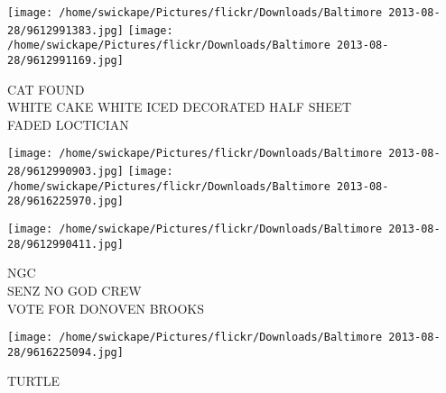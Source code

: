 \documentclass[10pt,letterpaper]{article}
\begin{document}
\vspace{0.25in}
\texttt{[image: /home/swickape/Pictures/flickr/Downloads/Baltimore 2013-08-28/9612991383.jpg]}
\texttt{[image: /home/swickape/Pictures/flickr/Downloads/Baltimore 2013-08-28/9612991169.jpg]}

CAT FOUND\\
WHITE CAKE WHITE ICED DECORATED HALF SHEET\\
FADED LOCTICIAN\\
\pagebreak

\texttt{[image: /home/swickape/Pictures/flickr/Downloads/Baltimore 2013-08-28/9612990903.jpg]}
\texttt{[image: /home/swickape/Pictures/flickr/Downloads/Baltimore 2013-08-28/9616225970.jpg]}

\vspace{0.25in}
\texttt{[image: /home/swickape/Pictures/flickr/Downloads/Baltimore 2013-08-28/9612990411.jpg]}

NGC\\
SENZ NO GOD CREW\\
VOTE FOR DONOVEN BROOKS\\
\pagebreak

\texttt{[image: /home/swickape/Pictures/flickr/Downloads/Baltimore 2013-08-28/9616225094.jpg]}

TURTLE\\
\pagebreak
\end{document}
